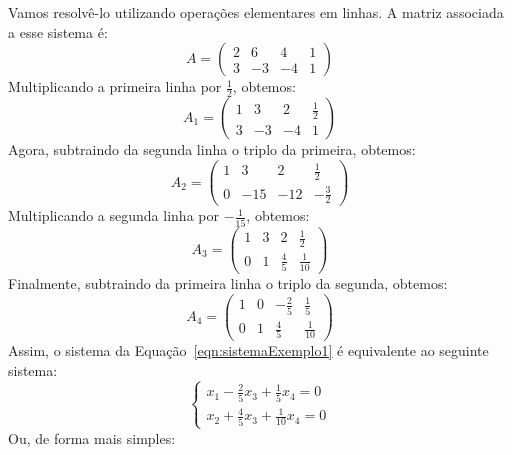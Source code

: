Vamos resolvê-lo utilizando operações elementares em linhas.
A matriz associada a esse sistema é:
\begin{equation*}
    A = \begin{pmatrix}
        2 & 6 & 4 & 1 \\
        3 & -3 & -4 & 1
    \end{pmatrix}
\end{equation*}
Multiplicando a primeira linha por $\frac{1}{2}$, obtemos:
\begin{equation*}
    A_1 = \begin{pmatrix}
        1 & 3 & 2 & \frac{1}{2} \\
        3 & -3 & -4 & 1
    \end{pmatrix}
\end{equation*}
Agora, subtraindo da segunda linha o triplo da primeira, obtemos:
\begin{equation*}
    A_2 = \begin{pmatrix}
        1 & 3 & 2 & \frac{1}{2} \\
        0 & -15 & -12 & -\frac{3}{2}
    \end{pmatrix}
\end{equation*}
Multiplicando a segunda linha por $-\frac{1}{15}$, obtemos:
\begin{equation*}
    A_3 = \begin{pmatrix}
        1 & 3 & 2 & \frac{1}{2} \\
        0 & 1 & \frac{4}{5} & \frac{1}{10}
    \end{pmatrix}
\end{equation*}
Finalmente, subtraindo da primeira linha o triplo da segunda, obtemos:
\begin{equation*}
    A_4 = \begin{pmatrix}
        1 & 0 & -\frac{2}{5} & \frac{1}{5} \\
        0 & 1 & \frac{4}{5} & \frac{1}{10}
    \end{pmatrix}
\end{equation*}
Assim, o sistema da Equação~\eqref{eqn:sistemaExemplo1} é equivalente ao seguinte sistema:
\begin{equation}\label{eqn:sistemaExemplo2}
    \begin{cases}
        x_1 - \frac{2}{5}x_3 + \frac{1}{5}x_4 = 0 \\
        x_2 + \frac{4}{5}x_3 + \frac{1}{10}x_4 = 0
    \end{cases}
\end{equation}
Ou, de forma mais simples:
